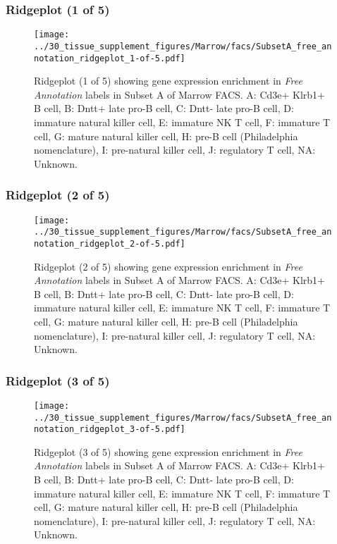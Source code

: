 \clearpage

\subsubsection{Ridgeplot (1 of 5)}
\begin{figure}[h]
\centering
\texttt{[image: ../30\_tissue\_supplement\_figures/Marrow/facs/SubsetA\_free\_annotation\_ridgeplot\_1-of-5.pdf]}

\caption{ Ridgeplot (1 of 5)  showing gene expression enrichment in \emph{Free Annotation} labels in Subset A of Marrow FACS. A: Cd3e+ Klrb1+ B cell, B: Dntt+ late pro-B cell, C: Dntt- late pro-B cell, D: immature natural killer cell, E: immature NK T cell, F: immature T cell, G: mature natural killer cell, H: pre-B cell (Philadelphia nomenclature), I: pre-natural killer cell, J: regulatory T cell, NA: Unknown.}
\end{figure}


\clearpage

\subsubsection{Ridgeplot (2 of 5)}
\begin{figure}[h]
\centering
\texttt{[image: ../30\_tissue\_supplement\_figures/Marrow/facs/SubsetA\_free\_annotation\_ridgeplot\_2-of-5.pdf]}

\caption{ Ridgeplot (2 of 5)  showing gene expression enrichment in \emph{Free Annotation} labels in Subset A of Marrow FACS. A: Cd3e+ Klrb1+ B cell, B: Dntt+ late pro-B cell, C: Dntt- late pro-B cell, D: immature natural killer cell, E: immature NK T cell, F: immature T cell, G: mature natural killer cell, H: pre-B cell (Philadelphia nomenclature), I: pre-natural killer cell, J: regulatory T cell, NA: Unknown.}
\end{figure}


\clearpage

\subsubsection{Ridgeplot (3 of 5)}
\begin{figure}[h]
\centering
\texttt{[image: ../30\_tissue\_supplement\_figures/Marrow/facs/SubsetA\_free\_annotation\_ridgeplot\_3-of-5.pdf]}

\caption{ Ridgeplot (3 of 5)  showing gene expression enrichment in \emph{Free Annotation} labels in Subset A of Marrow FACS. A: Cd3e+ Klrb1+ B cell, B: Dntt+ late pro-B cell, C: Dntt- late pro-B cell, D: immature natural killer cell, E: immature NK T cell, F: immature T cell, G: mature natural killer cell, H: pre-B cell (Philadelphia nomenclature), I: pre-natural killer cell, J: regulatory T cell, NA: Unknown.}
\end{figure}



